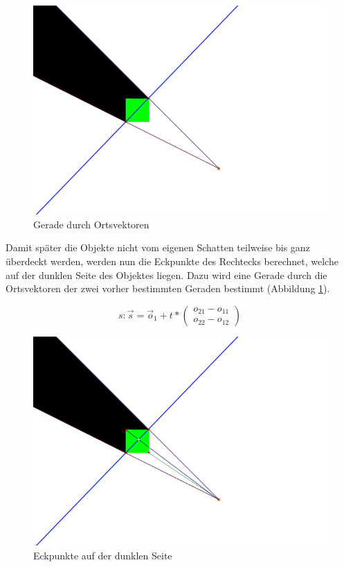 \begin{figure}[t]
	\centering
	\includegraphics[width=\columnwidth]{images/durchfuehrung_2.png}
	\caption{Gerade durch Ortsvektoren}
	\label{fig:durch4}
\end{figure}

Damit später die Objekte nicht vom eigenen Schatten teilweise bis ganz überdeckt werden, werden nun die Eckpunkte des Rechtecks berechnet, welche auf der dunklen Seite des Objektes liegen. Dazu wird eine Gerade durch die Ortsvektoren der zwei vorher bestimmten Geraden bestimmt (Abbildung \ref{fig:durch4}).

\begin{equation}
	s: \vec{s} = \vec{o}_1 + t * \left(\begin{array}{c} o_21 - o_11 \\ o_22 - o_12 \end{array}\right)
\end{equation}

\begin{figure}[t]
	\centering
	\includegraphics[width=\columnwidth]{images/durchfuehrung_3.png}
	\caption{Eckpunkte auf der dunklen Seite}
	\label{fig:durch5}
\end{figure}

